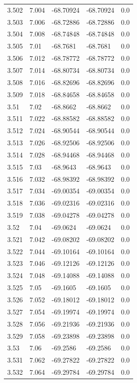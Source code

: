 \begin{tabular}{lllll}
3.502 & 7.004 & -68.70924 & -68.70924 & 0.0 \\
3.503 & 7.006 & -68.72886 & -68.72886 & 0.0 \\
3.504 & 7.008 & -68.74848 & -68.74848 & 0.0 \\
3.505 & 7.01 & -68.7681 & -68.7681 & 0.0 \\
3.506 & 7.012 & -68.78772 & -68.78772 & 0.0 \\
3.507 & 7.014 & -68.80734 & -68.80734 & 0.0 \\
3.508 & 7.016 & -68.82696 & -68.82696 & 0.0 \\
3.509 & 7.018 & -68.84658 & -68.84658 & 0.0 \\
3.51 & 7.02 & -68.8662 & -68.8662 & 0.0 \\
3.511 & 7.022 & -68.88582 & -68.88582 & 0.0 \\
3.512 & 7.024 & -68.90544 & -68.90544 & 0.0 \\
3.513 & 7.026 & -68.92506 & -68.92506 & 0.0 \\
3.514 & 7.028 & -68.94468 & -68.94468 & 0.0 \\
3.515 & 7.03 & -68.9643 & -68.9643 & 0.0 \\
3.516 & 7.032 & -68.98392 & -68.98392 & 0.0 \\
3.517 & 7.034 & -69.00354 & -69.00354 & 0.0 \\
3.518 & 7.036 & -69.02316 & -69.02316 & 0.0 \\
3.519 & 7.038 & -69.04278 & -69.04278 & 0.0 \\
3.52 & 7.04 & -69.0624 & -69.0624 & 0.0 \\
3.521 & 7.042 & -69.08202 & -69.08202 & 0.0 \\
3.522 & 7.044 & -69.10164 & -69.10164 & 0.0 \\
3.523 & 7.046 & -69.12126 & -69.12126 & 0.0 \\
3.524 & 7.048 & -69.14088 & -69.14088 & 0.0 \\
3.525 & 7.05 & -69.1605 & -69.1605 & 0.0 \\
3.526 & 7.052 & -69.18012 & -69.18012 & 0.0 \\
3.527 & 7.054 & -69.19974 & -69.19974 & 0.0 \\
3.528 & 7.056 & -69.21936 & -69.21936 & 0.0 \\
3.529 & 7.058 & -69.23898 & -69.23898 & 0.0 \\
3.53 & 7.06 & -69.2586 & -69.2586 & 0.0 \\
3.531 & 7.062 & -69.27822 & -69.27822 & 0.0 \\
3.532 & 7.064 & -69.29784 & -69.29784 & 0.0 \\

\end{tabular}
